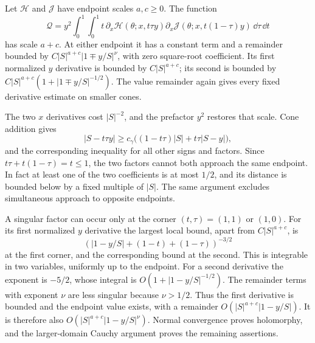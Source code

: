 \begin{lmm}\label{lmm:b:quadratic-endpoint}
Let $\mathcal H$ and $\mathcal J$ have endpoint scales $a,c\geq0$.
The function
\begin{equation}\label{eq:b:quadratic-input}
 \mathcal Q=y^2\int_0^1\int_0^1
 t\,\partial_x\mathcal H(\theta;x,t\tau y)
       \partial_x\mathcal J(\theta;x,t(1-\tau)y)
                              \,\dd\tau\,\dd t
\end{equation}
has scale $a+c$. At either endpoint it has a constant term and
a remainder bounded by $C|S|^{a+c}|1\mp y/S|^\nu$, with zero
square-root coefficient. Its first normalized $y$ derivative is
bounded by $C|S|^{a+c}$; its second is bounded by
$C|S|^{a+c}(1+|1\mp y/S|^{-1/2})$.
The value remainder again gives every fixed derivative estimate
on smaller cones.
\end{lmm}
\begin{prf}
The two $x$ derivatives cost $|S|^{-2}$, and the prefactor $y^2$
restores that scale. Cone addition gives
\[
 |S-t\tau y|\geq c_\gamma
       \bigl((1-t\tau)|S|+t\tau|S-y|\bigr),
\]
and the corresponding inequality for all other signs and factors.
Since $t\tau+t(1-\tau)=t\leq1$, the two factors cannot both
approach the same endpoint. In fact at least one of the two
coefficients is at most $1/2$, and its distance is bounded below
by a fixed multiple of $|S|$. The same argument excludes
simultaneous approach to opposite endpoints.

A singular factor can occur only at the corner $(t,\tau)=(1,1)$
or $(1,0)$. For its first normalized $y$ derivative the largest
local bound, apart from $C|S|^{a+c}$, is
\[
 (|1-y/S|+(1-t)+(1-\tau))^{-3/2}
\]
at the first corner, and the corresponding bound at the second.
This is integrable in two variables, uniformly up to the endpoint.
For a second derivative the exponent is $-5/2$, whose integral is
$O(1+|1-y/S|^{-1/2})$. The remainder terms with exponent $\nu$
are less singular because $\nu>1/2$. Thus the first derivative
is bounded and the endpoint value exists, with a remainder
$O(|S|^{a+c}|1-y/S|)$. It is therefore also $O(|S|^{a+c}|1-y/S|^\nu)$.
Normal convergence proves holomorphy, and the larger-domain
Cauchy argument proves the remaining assertions.
\end{prf}
